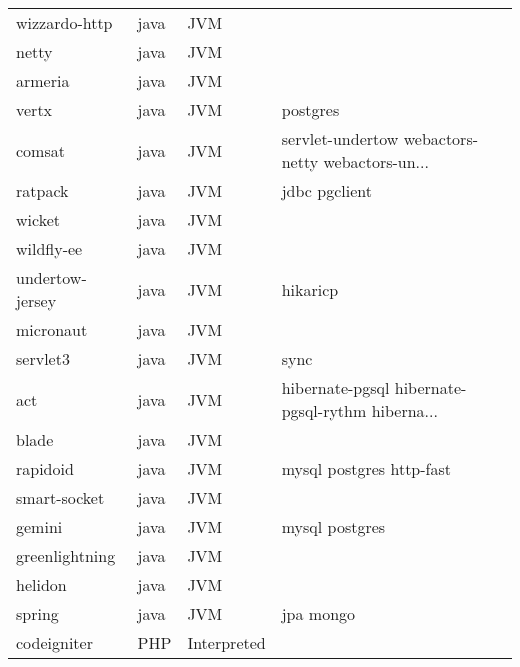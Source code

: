 \begin{longtable}{llll}
    wizzardo-http    & java & JVM       &                                                    \\
    netty            & java & JVM       &                                                    \\
    armeria          & java & JVM       &                                                    \\
    vertx            & java & JVM       & postgres                                           \\
    comsat           & java & JVM       & servlet-undertow webactors-netty webactors-un...   \\
    ratpack          & java & JVM       & jdbc pgclient                                      \\
    wicket           & java & JVM       &                                                    \\
    wildfly-ee       & java & JVM       &                                                    \\
    undertow-jersey  & java & JVM       & hikaricp                                           \\
    micronaut        & java & JVM       &                                                    \\
    servlet3         & java & JVM       & sync                                               \\
    act              & java & JVM       & hibernate-pgsql hibernate-pgsql-rythm hiberna...   \\
    blade            & java & JVM       &                                                    \\
    rapidoid         & java & JVM       & mysql postgres http-fast                           \\
    smart-socket     & java & JVM       &                                                    \\
    gemini           & java & JVM       & mysql postgres                                     \\
    greenlightning   & java & JVM       &                                                    \\
    helidon          & java & JVM       &                                                    \\
    spring           & java & JVM       & jpa mongo                                          \\
    codeigniter      & PHP & Interpreted         &                                                    \\

\end{longtable}
